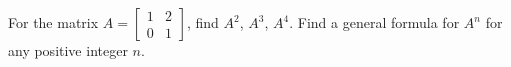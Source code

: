 For the matrix 
$A = \begin{bmatrix} 1 & 2 \\ 0 & 1 \end{bmatrix}$, 
find $A^2$, $A^3$, $A^4$.  Find a general formula for $A^n$ for any positive integer $n$.
